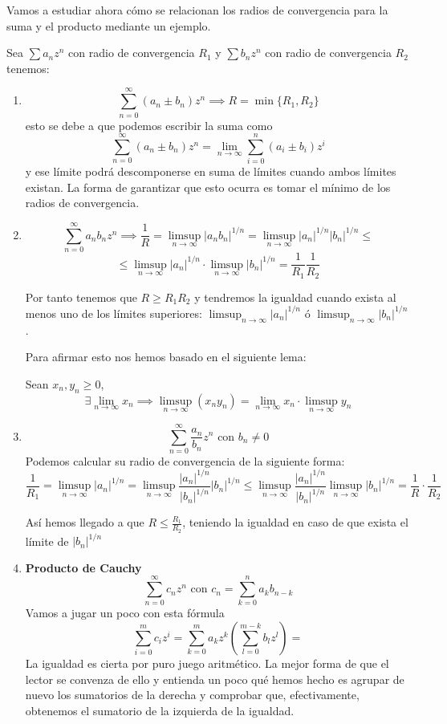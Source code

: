 \documentclass{apuntes}
\begin{document}
Vamos a estudiar ahora cómo se relacionan los radios de convergencia para la suma y el producto mediante un ejemplo.
\begin{example}
Sea $\sum a_nz^n$ con radio de convergencia $R_1$ y $\sum b_n z^n$ con radio de convergencia $R_2$ tenemos:
\begin{enumerate}
\item
\[\sum_{n=0}^{\infty}(a_n\pm b_n)z^n \implies R = \min\{R_1, R_2\}\]
esto se debe a que podemos escribir la suma como
\[\sum_{n=0}^{\infty}(a_n\pm b_n)z^n = \lim_{n \to \infty} \sum_{i=0}^n (a_i\pm b_i)z^i\]
y ese límite podrá descomponerse en suma de límites cuando ambos límites existan. La forma de garantizar que esto ocurra es tomar el mínimo de los radios de convergencia.

\item
\[\sum_{n=0}^{\infty} a_nb_nz^n \implies \frac{1}{R}=\limsup_{ n \to \infty}|a_nb_n|^{1/n} = \limsup_{n\to \infty}|a_n|^{1/n}|b_n|^{1/n} \leq\]
\[\leq \limsup_{n\to \infty} |a_n|^{1/n}\cdot \limsup_{n\to \infty} |b_n|^{1/n} = \frac{1}{R_1}\frac{1}{R_2}\]

Por tanto tenemos que $R \geq R_1R_2$ y tendremos la igualdad cuando exista al menos uno de los límites superiores: $\limsup_{n\to \infty} |a_n|^{1/n}$ ó $\limsup_{n\to \infty}|b_n|^{1/n}$.

Para afirmar esto nos hemos basado en el siguiente lema:
\begin{lemma}
Sean $x_n,y_n \geq 0$,
\[\exists \lim_{n \to \infty} x_n \implies \limsup_{n \to \infty }(x_ny_n)=\lim_{n \to \infty}x_n \cdot \limsup_{n \to \infty} y_n\]
\end{lemma}

\item
\[\sum_{n = 0}^{\infty} \frac{a_n}{b_n}z^n \text{ con } b_n \neq 0\]
Podemos calcular su radio de convergencia de la siguiente forma:
\[\frac{1}{R_1}=\limsup_{n \to \infty} |a_n|^{1/n} = \limsup_{n \to \infty} \frac{|a_n|^{1/n}}{|b_n|^{1/n}}|b_n|^{1/n} \leq \limsup_{n \to \infty} \frac{|a_n|^{1/n}}{|b_n|^{1/n}}\limsup_{n \to \infty} |b_n|^{1/n}=\frac{1}{R}\cdot \frac{1}{R_2}\]

Así hemos llegado a que $R \leq \frac{R_1}{R_2}$, teniendo la igualdad en caso de que exista el límite de $|b_n|^{1/n}$

\item \textbf{Producto de Cauchy}
\[\sum_{n=0}^{\infty}c_nz^n \text{ con } c_n=\sum_{k=0}^{n}a_kb_{n-k}\]
Vamos a jugar un poco con esta fórmula
\[\sum_{i=0}^{m}c_iz^i = \sum_{k=0}^m a_kz^k\left(\sum_{l=0}^{m-k} b_lz^l \right)=\]
La igualdad es cierta por puro juego aritmético. La mejor forma de que el lector se convenza de ello y entienda un poco qué hemos hecho es agrupar de nuevo los sumatorios de la derecha y comprobar que, efectivamente, obtenemos el sumatorio de la izquierda de la igualdad.


\end{enumerate}
\end{example}
\end{document}
